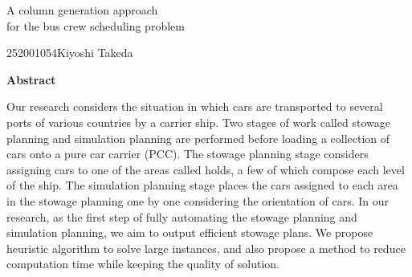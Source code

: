\newpage
\begin{center}{\LARGE A column generation approach \\for the bus crew scheduling problem}\\[0.5cm]
\end{center}
\hfill {\large 252001054\qquad Kiyoshi Takeda}\\[0.5cm]
\begin{center}
{\large \bf Abstract}\\
\end{center}
Our research considers the situation in which cars are transported to several ports of various countries by a carrier ship. Two stages of work called stowage planning and simulation planning are performed before loading a collection of cars onto a pure car carrier (PCC). The stowage planning stage considers assigning cars to one of the areas called holds, a few of which compose each level of the ship. The simulation planning stage places the cars assigned to each area in the stowage planning one by one considering the orientation of cars.
 In our research, as the first step of fully automating the stowage planning and simulation planning, we aim to output efficient stowage plans.
 We propose heuristic algorithm to solve large instances, and also propose a method to reduce computation time while keeping the quality of solution.
